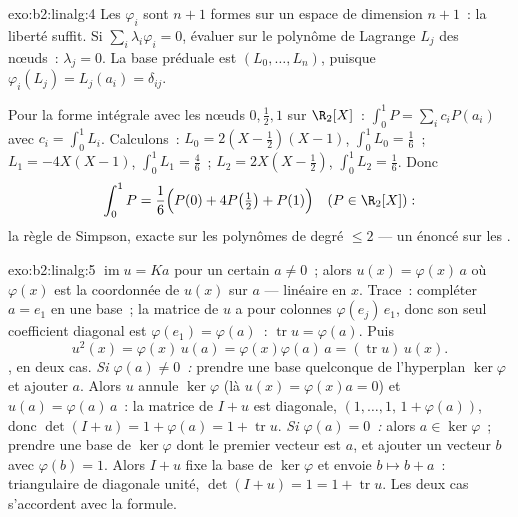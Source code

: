 \begin{solution}{exo:b2:linalg:4}
Les $\varphi_i$ sont $n + 1$ formes sur un espace de dimension $n+1$~:
la liberté suffit. Si $\sum_i \lambda_i \varphi_i = 0$, évaluer sur
le polynôme de Lagrange $L_j$ des nœuds~: $\lambda_j = 0$. La
base préduale est $(L_0, \dots, L_n)$, puisque $\varphi_i(L_j) =
L_j(a_i) = \delta_{ij}$.

Pour la forme intégrale avec les nœuds $0, \frac12, 1$ sur $\R_2[X]$~:
$\int_0^1 P = \sum_i c_i P(a_i)$ avec $c_i = \int_0^1 L_i$. Calculons~:
$L_0 = 2(X - \tfrac12)(X - 1)$, $\int_0^1 L_0 = \frac16$~; $L_1 =
-4X(X-1)$, $\int_0^1 L_1 = \frac46$~; $L_2 = 2X(X - \tfrac12)$,
$\int_0^1 L_2 = \frac16$. Donc
\[
\int_0^1 P = \frac{1}{6}\Bigl(P(0) + 4P\bigl(\tfrac12\bigr) +
P(1)\Bigr)
\quad (P \in \R_2[X]) :
\]
la règle de Simpson, exacte sur les polynômes de degré $\leq 2$ --- un
énoncé sur les .
\end{solution}

\begin{solution}{exo:b2:linalg:5}
$\operatorname{im} u = Ka$ pour un certain $a \neq 0$~; alors $u(x) =
\varphi(x)\,a$ où $\varphi(x)$ est la coordonnée de $u(x)$ sur $a$
--- linéaire en $x$. Trace~: compléter $a = e_1$ en une base~; la
matrice de $u$ a pour colonnes $\varphi(e_j)\,e_1$, donc son seul
coefficient diagonal est $\varphi(e_1) = \varphi(a)$~: $\operatorname{tr} u =
\varphi(a)$. Puis
\[
u^2(x) = \varphi(x)\, u(a) = \varphi(x)\varphi(a)\, a
= (\operatorname{tr} u)\, u(x).
\]
, en deux cas. \emph{Si $\varphi(a) \neq 0$~:} prendre une
base quelconque de l'hyperplan $\ker\varphi$ et ajouter $a$. Alors $u$
annule $\ker\varphi$ (là $u(x) = \varphi(x)a = 0$) et $u(a) =
\varphi(a)\,a$~: la matrice de $I + u$ est diagonale, $(1, \dots, 1,\,
1 + \varphi(a))$, donc $\det(I + u) = 1 + \varphi(a) = 1 +
\operatorname{tr} u$. \emph{Si $\varphi(a) = 0$~:} alors $a \in
\ker\varphi$~; prendre une base de $\ker\varphi$ dont le premier vecteur
est $a$, et ajouter un vecteur $b$ avec $\varphi(b) = 1$. Alors $I + u$
fixe la base de $\ker\varphi$ et envoie $b \mapsto b + a$~:
triangulaire de diagonale unité, $\det(I + u) = 1 = 1 +
\operatorname{tr} u$. Les deux cas s'accordent avec la formule.
\end{solution}

